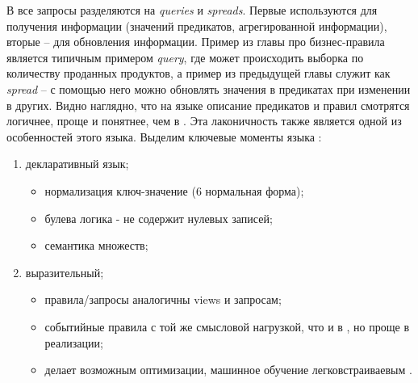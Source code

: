В \logiql все запросы разделяются на \emph{queries} и \emph{spreads}. Первые используются для получения информации (значений предикатов, агрегированной информации), вторые – для обновления информации. Пример из главы про бизнес-правила является типичным примером \emph{query}, где может происходить выборка по количеству проданных продуктов, а пример из предыдущей главы служит как \emph{spread} – с помощью него можно обновлять значения в предикатах при изменении в других.
Видно наглядно, что на языке \logiql описание предикатов и правил смотрятся логичнее, проще и понятнее, чем в \sql. Эта лаконичность также является одной из особенностей этого языка.
Выделим ключевые моменты языка \logiql:

\begin{enumerate}
  \item декларативный язык;
  \begin{itemize}
    \item нормализация ключ-значение (6 нормальная форма);
    \item булева логика - не содержит нулевых записей;
    \item семантика множеств;
  \end{itemize}
  \item выразительный;
  \begin{itemize}
    \item правила/запросы аналогичны \sql views и запросам;
    \item событийные правила с той же смысловой нагрузкой, что и в \sql, но проще в реализации;
    \item делает возможным оптимизации, машинное обучение легковстраиваевым \cite{query_language_for_smart_db}.
  \end{itemize}
\end{enumerate}



